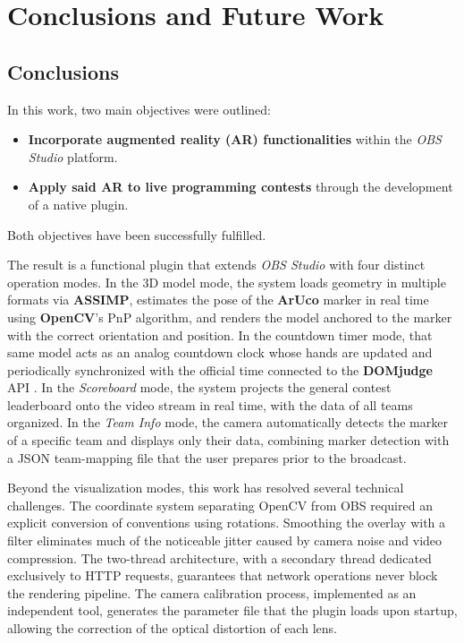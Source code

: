 \chapter{Conclusions and Future Work}
\label{cap:conclusions_en}


\section{Conclusions}

In this work, two main objectives were outlined:

\begin{itemize}
    \item \textbf{Incorporate augmented reality (AR) functionalities} within the \textit{OBS Studio} platform.
    \item \textbf{Apply said AR to live programming contests} through the development of a native plugin.
\end{itemize}

Both objectives have been successfully fulfilled.

The result is a functional plugin that extends \textit{OBS Studio} with four distinct operation modes. In the 3D model mode, the system loads geometry in multiple formats via \textbf{ASSIMP}, estimates the pose of the \textbf{ArUco} marker in real time using \textbf{OpenCV}'s PnP algorithm, and renders the model anchored to the marker with the correct orientation and position. In the countdown timer mode, that same model acts as an analog countdown clock whose hands are updated and periodically synchronized with the official time connected to the \textbf{DOMjudge} API \citep{DOMjudge}. In the \textit{Scoreboard} mode, the system projects the general contest leaderboard onto the video stream in real time, with the data of all teams organized. In the \textit{Team Info} mode, the camera automatically detects the marker of a specific team and displays only their data, combining marker detection with a JSON team-mapping file that the user prepares prior to the broadcast.

Beyond the visualization modes, this work has resolved several technical challenges. The coordinate system separating OpenCV from OBS required an explicit conversion of conventions using rotations. Smoothing the overlay with a filter eliminates much of the noticeable jitter caused by camera noise and video compression. The two-thread architecture, with a secondary thread dedicated exclusively to HTTP requests, guarantees that network operations never block the rendering pipeline. The camera calibration process, implemented as an independent tool, generates the parameter file that the plugin loads upon startup, allowing the correction of the optical distortion of each lens.


